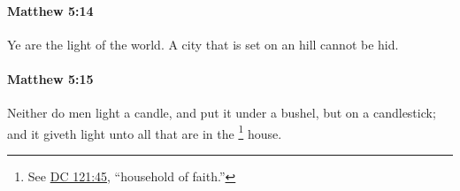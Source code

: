 		\paragraph{Matthew 5:14} %
			\label{MATTHEW-5-14}

			Ye are the light of the world. A city that is set on an hill cannot be hid.

			\begin{framed}
			\scriptsize
				\begin{compactdesc}
					\item[SBLG] 
				\end{compactdesc}
			\end{framed}

		\paragraph{Matthew 5:15} %
			\label{MATTHEW-5-15}

			Neither do men light a candle, and put it under a bushel, but on a candlestick; and it giveth light unto all that are in the
				\footnote{%
					See \hyperref[DC121-45]{DC 121:45}, ``household of faith.''
					}%
			house.

